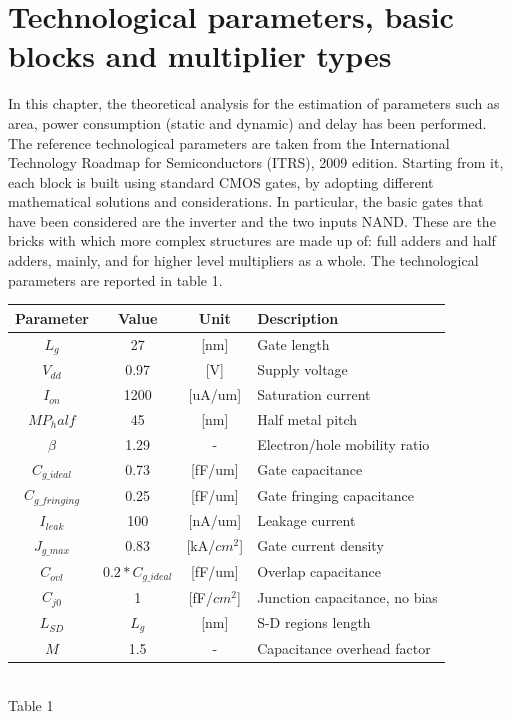 \documentclass[11pt]{article} %
\begin{document}
\section{Technological parameters, basic blocks and multiplier types}
In this chapter, the theoretical analysis for the estimation of parameters such as area, power consumption (static and dynamic) and delay has been performed. The reference technological parameters are taken from the International Technology Roadmap for Semiconductors (ITRS), 2009 edition. Starting from it, each block is built using standard CMOS gates, by adopting different mathematical solutions and considerations. In particular, the basic gates that have been considered are the inverter and the two inputs NAND. These are the bricks with which more complex structures are made up of: full adders and half adders, mainly, and for higher level multipliers as a whole. The technological parameters are reported in table 1.\\
\begin{center}
\begin{tabular}{|c|c|c|l|}
\hline
Parameter & Value & Unit & Description \\
\hline
\textbf{$L_g$} & 27 & [nm]& Gate length   \\
\hline
\textbf{$V_{dd}$} & 0.97 & [V]& Supply voltage  \\
\hline
\textbf{$I_{on}$} & 1200 &[uA/um] & Saturation current   \\
\hline
\textbf{$MP_half$} & 45 &[nm]& Half metal pitch  \\
\hline
\textbf{$\beta$} &1.29& - &Electron/hole mobility ratio \\
\hline
\textbf{$C_{g\_ideal}$} &  0.73 &[fF/um] & Gate capacitance \\
\hline
\textbf{$C_{g\_fringing}$} &  0.25 &[fF/um]& Gate fringing capacitance   \\
\hline
\textbf{$I_{leak}$} & 100 &[nA/um]& Leakage current  \\
\hline
\textbf{$J_{g\_max}$} & 0.83 &[kA/$cm^2$] & Gate current density  \\
\hline
\textbf{$C_{ovl}$} & $0.2*C_{g\_ideal}$& [fF/um]& Overlap capacitance  \\
\hline
\textbf{$C_{j0}$} & 1 & [fF/$cm^2$] & Junction capacitance, no bias  \\
\hline
\textbf{$L_{SD}$} & $L_g$& [nm] & S-D regions length\\
\hline
\textbf{$M$} & 1.5 & - & Capacitance overhead factor \\
\hline
\end{tabular}\\
\small{Table 1}
\end{center}
\end{document}
